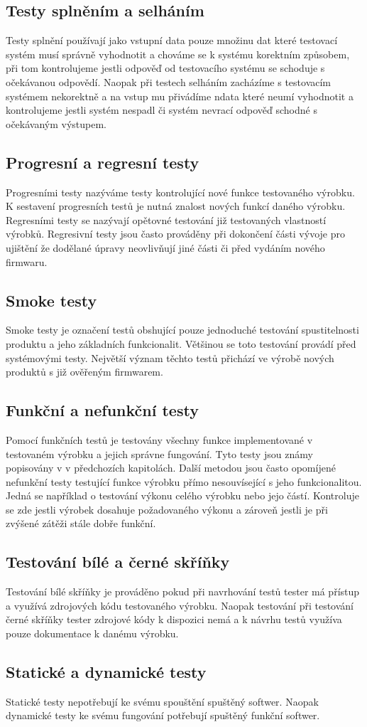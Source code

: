 \subsection{Testy splněním a selháním}
Testy splnění používají jako vstupní data pouze množinu dat které testovací systém musí správně vyhodnotit a chováme se k systému korektním způsobem, při tom kontrolujeme jestli odpověď od testovacího systému se schoduje s očekávanou odpovědí. Naopak při testech selháním zacházíme s testovacím systémem nekorektně a na vstup mu přivádíme ndata které neumí vyhodnotit a kontrolujeme jestli systém nespadl či systém nevrací odpověď schodné s očekávaným výstupem.

\subsection{Progresní a regresní testy}
Progresními testy nazýváme testy kontrolující nové funkce testovaného výrobku. K sestavení progresních testů je nutná znalost nových funkcí daného výrobku. Regresními testy se nazývají opětovné testování již testovaných vlastností výrobků. Regresivní testy jsou často prováděny při dokončení části vývoje pro ujištění že dodělané úpravy neovlivňují jiné části či před vydáním nového firmwaru.

\subsection{Smoke testy}
Smoke testy je označení testů  obshující pouze jednoduché testování spustitelnosti produktu a jeho základních funkcionalit. Většinou se toto testování provádí před systémovými testy. Největší význam těchto testů přichází ve výrobě nových produktů s již ověřeným firmwarem.

\subsection{Funkční a nefunkční testy}
Pomocí funkčních testů je testovány všechny funkce implementované v testovaném výrobku a jejich správne fungování. Tyto testy jsou známy popisovány v v předchozích kapitolách. Další metodou jsou často opomíjené nefunkční testy testující funkce výrobku přímo nesouvísející s jeho funkcionalitou. Jedná se například o testování výkonu celého výrobku nebo jejo částí. Kontroluje se zde jestli výrobek dosahuje požadovaného výkonu a zároveň jestli je při zvýšené zátěži stále dobře funkční.

\subsection{Testování bílé a černé skříňky}
Testování bílé skříňky je prováděno pokud při navrhování testů tester má přístup a využívá zdrojových kódu testovaného výrobku. Naopak testování při testování černé skříňky tester zdrojové kódy k dispozici nemá a k návrhu testů využíva pouze dokumentace k danému výrobku.


\subsection{Statické a dynamické testy}
Statické testy nepotřebují ke svému spouštění spuštěný softwer. Naopak dynamické testy ke svému fungování potřebují spuštěný funkční softwer.


\endinput
